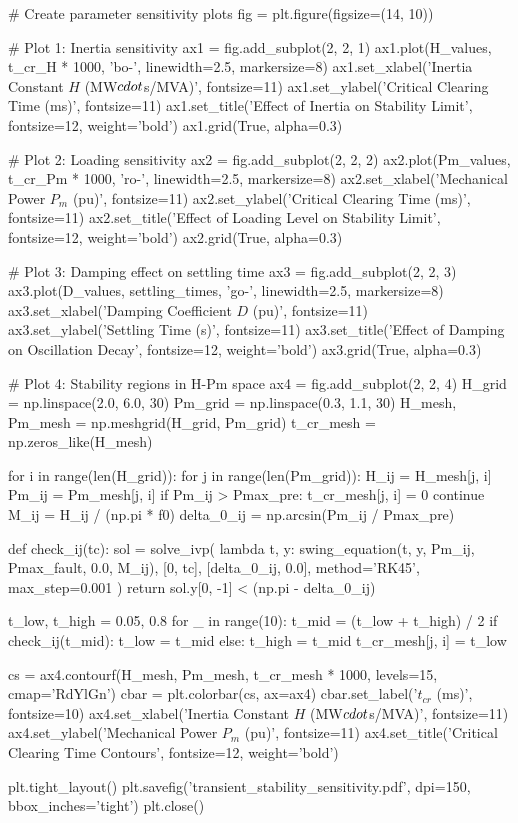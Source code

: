 \documentclass[11pt,a4paper]{article}
\begin{document}
\begin{pycode}
# Create parameter sensitivity plots
fig = plt.figure(figsize=(14, 10))

# Plot 1: Inertia sensitivity
ax1 = fig.add_subplot(2, 2, 1)
ax1.plot(H_values, t_cr_H * 1000, 'bo-', linewidth=2.5, markersize=8)
ax1.set_xlabel('Inertia Constant $H$ (MW$\\cdot$s/MVA)', fontsize=11)
ax1.set_ylabel('Critical Clearing Time (ms)', fontsize=11)
ax1.set_title('Effect of Inertia on Stability Limit', fontsize=12, weight='bold')
ax1.grid(True, alpha=0.3)

# Plot 2: Loading sensitivity
ax2 = fig.add_subplot(2, 2, 2)
ax2.plot(Pm_values, t_cr_Pm * 1000, 'ro-', linewidth=2.5, markersize=8)
ax2.set_xlabel('Mechanical Power $P_m$ (pu)', fontsize=11)
ax2.set_ylabel('Critical Clearing Time (ms)', fontsize=11)
ax2.set_title('Effect of Loading Level on Stability Limit', fontsize=12, weight='bold')
ax2.grid(True, alpha=0.3)

# Plot 3: Damping effect on settling time
ax3 = fig.add_subplot(2, 2, 3)
ax3.plot(D_values, settling_times, 'go-', linewidth=2.5, markersize=8)
ax3.set_xlabel('Damping Coefficient $D$ (pu)', fontsize=11)
ax3.set_ylabel('Settling Time (s)', fontsize=11)
ax3.set_title('Effect of Damping on Oscillation Decay', fontsize=12, weight='bold')
ax3.grid(True, alpha=0.3)

# Plot 4: Stability regions in H-Pm space
ax4 = fig.add_subplot(2, 2, 4)
H_grid = np.linspace(2.0, 6.0, 30)
Pm_grid = np.linspace(0.3, 1.1, 30)
H_mesh, Pm_mesh = np.meshgrid(H_grid, Pm_grid)
t_cr_mesh = np.zeros_like(H_mesh)

for i in range(len(H_grid)):
    for j in range(len(Pm_grid)):
        H_ij = H_mesh[j, i]
        Pm_ij = Pm_mesh[j, i]
        if Pm_ij > Pmax_pre:
            t_cr_mesh[j, i] = 0
            continue
        M_ij = H_ij / (np.pi * f0)
        delta_0_ij = np.arcsin(Pm_ij / Pmax_pre)

        def check_ij(tc):
            sol = solve_ivp(
                lambda t, y: swing_equation(t, y, Pm_ij, Pmax_fault, 0.0, M_ij),
                [0, tc], [delta_0_ij, 0.0], method='RK45', max_step=0.001
            )
            return sol.y[0, -1] < (np.pi - delta_0_ij)

        t_low, t_high = 0.05, 0.8
        for _ in range(10):
            t_mid = (t_low + t_high) / 2
            if check_ij(t_mid):
                t_low = t_mid
            else:
                t_high = t_mid
        t_cr_mesh[j, i] = t_low

cs = ax4.contourf(H_mesh, Pm_mesh, t_cr_mesh * 1000, levels=15, cmap='RdYlGn')
cbar = plt.colorbar(cs, ax=ax4)
cbar.set_label('$t_{cr}$ (ms)', fontsize=10)
ax4.set_xlabel('Inertia Constant $H$ (MW$\\cdot$s/MVA)', fontsize=11)
ax4.set_ylabel('Mechanical Power $P_m$ (pu)', fontsize=11)
ax4.set_title('Critical Clearing Time Contours', fontsize=12, weight='bold')

plt.tight_layout()
plt.savefig('transient_stability_sensitivity.pdf', dpi=150, bbox_inches='tight')
plt.close()
\end{pycode}
\end{document}
